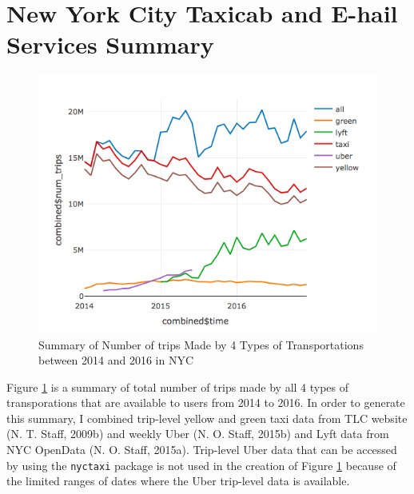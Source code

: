 \documentclass[12pt,twoside]{reedthesis}
\theoremstyle{definition}
\theoremstyle{definition}
\theoremstyle{definition}
\theoremstyle{remark}
\begin{document}
\section{New York City Taxicab and E-hail Services
Summary}\label{new-york-city-taxicab-and-e-hail-services-summary}
\begin{figure}[h]

{\centering \includegraphics[width=5.75in]{figure/Num_trips_summary} 

}

\caption{Summary of Number of trips Made by 4 Types of Transportations between 2014 and 2016 in NYC}\label{fig:num-trips-summary}
\end{figure}
Figure \ref{fig:num-trips-summary} is a summary of total number of trips
made by all 4 types of transporations that are available to users from
2014 to 2016. In order to generate this summary, I combined trip-level
yellow and green taxi data from TLC website (N. T. Staff, 2009b) and
weekly Uber (N. O. Staff, 2015b) and Lyft data from NYC OpenData (N. O.
Staff, 2015a). Trip-level Uber data that can be accessed by using the
\texttt{nyctaxi} package is not used in the creation of Figure
\ref{fig:num-trips-summary} because of the limited ranges of dates where
the Uber trip-level data is available.
\end{document}
